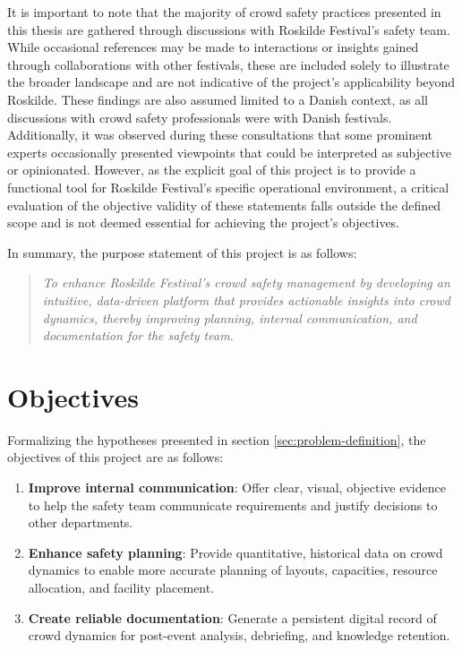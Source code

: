It is important to note that the majority of crowd safety practices presented in this thesis are gathered through discussions with Roskilde Festival's safety team. While occasional references may be made to interactions or insights gained through collaborations with other festivals, these are included solely to illustrate the broader landscape and are not indicative of the project's applicability beyond Roskilde. These findings are also assumed limited to a Danish context, as all discussions with crowd safety professionals were with Danish festivals. Additionally, it was observed during these consultations that some prominent experts occasionally presented viewpoints that could be interpreted as subjective or opinionated. However, as the explicit goal of this project is to provide a functional tool for Roskilde Festival's specific operational environment, a critical evaluation of the objective validity of these statements falls outside the defined scope and is not deemed essential for achieving the project's objectives.

In summary, the purpose statement of this project is as follows:
\begin{quote}
  \textit{To enhance Roskilde Festival's crowd safety management by developing an intuitive, data-driven platform that provides actionable insights into crowd dynamics, thereby improving planning, internal communication, and documentation for the safety team.}
\end{quote}

\section{Objectives}
\label{sec:objectives}

Formalizing the hypotheses presented in section \ref{sec:problem-definition}, the objectives of this project are as follows:
\begin{enumerate}
  \item \textbf{Improve internal communication}: Offer clear, visual, objective evidence to help the safety team communicate requirements and justify decisions to other departments.
  \item \textbf{Enhance safety planning}: Provide quantitative, historical data on crowd dynamics to enable more accurate planning of layouts, capacities, resource allocation, and facility placement.
  \item \textbf{Create reliable documentation}: Generate a persistent digital record of crowd dynamics for post-event analysis, debriefing, and knowledge retention.
\end{enumerate}

